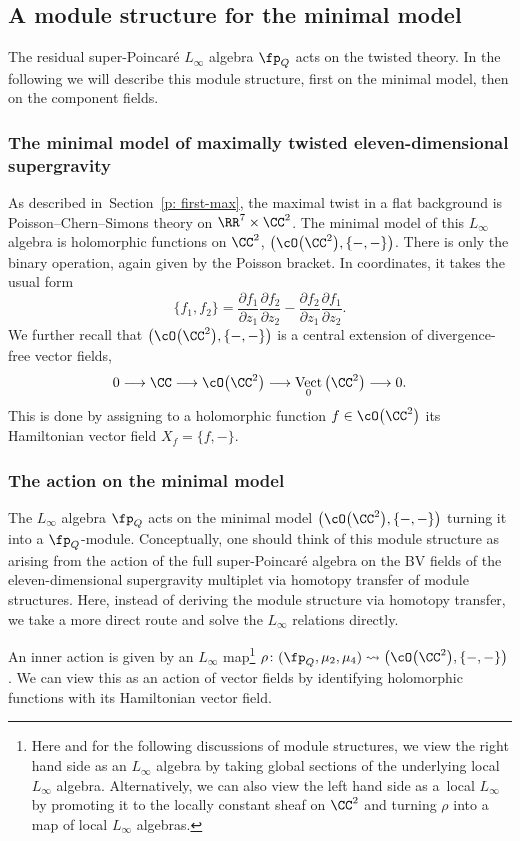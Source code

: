 \documentclass[10pt,a4paper]{amsart}
\numberwithin{equation}{section}
\theoremstyle{definition}
\DeclareMathOperator{\Vect}{Vect}
\begin{document}
\subsection{A module structure for the minimal model} \label{sec: max-module}
The residual super-Poincar\'e $L_\infty$ algebra $\fp_Q$ acts on the twisted theory. In the following we will describe this module structure, first on the minimal model, then on the component fields.

\subsubsection{The minimal model of maximally twisted eleven-dimensional supergravity}
As described in~Section~\ref{p: first-max}, the maximal twist in a flat background is Poisson--Chern--Simons theory on $\RR^7 \times \CC^2$. The minimal model of this $L_\infty$ algebra is holomorphic functions on $\CC^2$,
$ \big( \cO\big(\CC^2\big), \{-,-\} \big)$.
There is only the binary operation, again given by the Poisson bracket. In coordinates, it takes the usual form
\[
 \{f_1, f_2\} = \frac{\partial f_1}{\partial z_1} \frac{\partial f_2}{\partial z_2} - \frac{\partial f_2}{\partial z_1} \frac{\partial f_1}{\partial z_2} .
\]
We further recall that $\bigl(\cO\big(\CC^2\big), \{- , -\}\bigr)$ is a central extension of divergence-free vector fields,
\[
 0 \longrightarrow \CC \longrightarrow \cO\big(\CC^2\big) \longrightarrow \Vect_0\big(\CC^2\big) \longrightarrow 0 .
\]
This is done by assigning to a holomorphic function $f \in \cO\big(\CC^2\big)$ its Hamiltonian vector field $X_f = \{f,-\}$.

\subsubsection{The action on the minimal model}
The $L_\infty$ algebra $\fp_Q$ acts on the minimal model $\big(\cO\big(\CC^2\big) , \{-,-\}\big)$ turning it into a $\fp_Q$-module. Conceptually, one should think of this module structure as arising from the action of the full super-Poincar\'e algebra on the BV fields of the eleven-dimensional supergravity multiplet via homotopy transfer of module structures. Here, instead of deriving the module structure via homotopy transfer, we take a more direct route and solve the $L_\infty$ relations directly.

An inner action is given by an $L_\infty$ map\footnote{Here and for the following discussions of module structures, we view the right hand side as an $L_\infty$ algebra by taking global sections of the underlying local $L_\infty$ algebra. Alternatively, we can also view the left hand side as a~local $L_\infty$ by promoting it to the locally constant sheaf on $\CC^2$ and turning $\rho$ into a map of local $L_\infty$ algebras.}
$
 \rho\colon (\fp_Q , \mu_2, \mu_4) \rightsquigarrow \big(\cO\big(\CC^2\big) , \{-,-\}\big)$.
We can view this as an action of vector fields by identifying holomorphic functions with its Hamiltonian vector field.
\end{document}
